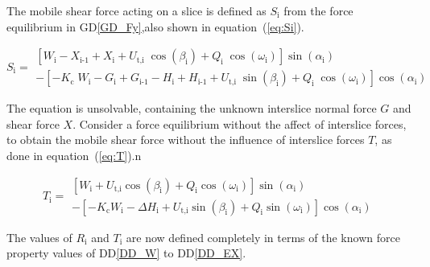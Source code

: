 \documentclass[12pt]{article}
\newcommand{\ddref}[1]{DD\ref{#1}}
\newcommand{\dref}[1]{GD\ref{#1}}
\begin{document}
\noindent
The mobile shear force acting on a slice is defined as $S_\text{i}$
from the force equilibrium in \dref{GD_Fy},also shown in
equation~(\ref{eq:Si}).

\begin{equation}  \label{eq:Si}
  S_{\text{i}} = \begin{array}{l} \left[ W_{\text{i}} -X_{\text{i-1}}
      + X_{\text{i}} +
      {U_{\text{t,i}}}\;{\cos\left(\beta_{\text{i}}\right)} +
      Q_{\text{i}}\;{\cos\left(\omega_{\text{i}}\right)}
      \right]\sin\left(\alpha_{\text{i}}\right) \\ - \left[
      {-K_{\text{c}}}\;{W_{\text{i}}} - G_{\text{i}} + G_{\text{i-1}}
      - H_{\text{i}} + H_{\text{i-1}} +
      {U_{\text{t,i}}}\;{\sin\left(\beta_{\text{i}}\right)} +
      Q_{\text{i}}\;{\cos\left(\omega_{\text{i}}\right)}
      \right]\cos\left(\alpha_{\text{i}}\right) \end{array}
\end{equation}

\noindent
The equation is unsolvable, containing the unknown interslice normal
force $G$ and shear force $X$.  Consider a force equilibrium without
the affect of interslice forces, to obtain the mobile shear force
without the influence of interslice forces $T$, as done in
equation~(\ref{eq:T}).n

\begin{equation}  \label{eq:T} T_{\text{i}} =
  \begin{array}{l}  
\left[ W_{\text{i}} + U_{\text{t,i}} \cos\left(\beta_{\text{i}}\right)
  + Q_{\text{i}} \cos\left(\omega_{\text{i}}\right) \right]
\sin\left(\alpha_{\text{i}}\right) \\ - \left[ - K_{\text{c}}
  W_{\text{i}} - \Delta H_{\text{i}} + U_{\text{t,i}}
  \sin\left(\beta_{\text{i}}\right) + Q_{\text{i}}
  \sin\left(\omega_{\text{i}}\right) \right]
\cos\left(\alpha_{\text{i}}\right) \end{array}
\end{equation}

\noindent
The values of $R_\text{i}$ and $T_\text{i}$ are now defined completely
in terms of the known force property values of \ddref{DD_W} to
\ddref{DD_EX}.

~\newline

\end{document}
